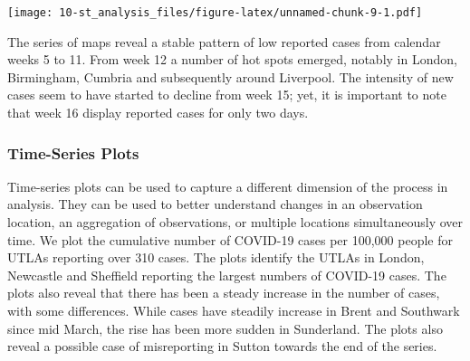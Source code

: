\documentclass[
]{book}
\begin{document}
\texttt{[image: 10-st\_analysis\_files/figure-latex/unnamed-chunk-9-1.pdf]}

The series of maps reveal a stable pattern of low reported cases from calendar weeks 5 to 11. From week 12 a number of hot spots emerged, notably in London, Birmingham, Cumbria and subsequently around Liverpool. The intensity of new cases seem to have started to decline from week 15; yet, it is important to note that week 16 display reported cases for only two days.

\hypertarget{time-series-plots}{%
\subsubsection{Time-Series Plots}\label{time-series-plots}}

Time-series plots can be used to capture a different dimension of the process in analysis. They can be used to better understand changes in an observation location, an aggregation of observations, or multiple locations simultaneously over time. We plot the cumulative number of COVID-19 cases per 100,000 people for UTLAs reporting over 310 cases. The plots identify the UTLAs in London, Newcastle and Sheffield reporting the largest numbers of COVID-19 cases. The plots also reveal that there has been a steady increase in the number of cases, with some differences. While cases have steadily increase in Brent and Southwark since mid March, the rise has been more sudden in Sunderland. The plots also reveal a possible case of misreporting in Sutton towards the end of the series.
\end{document}
